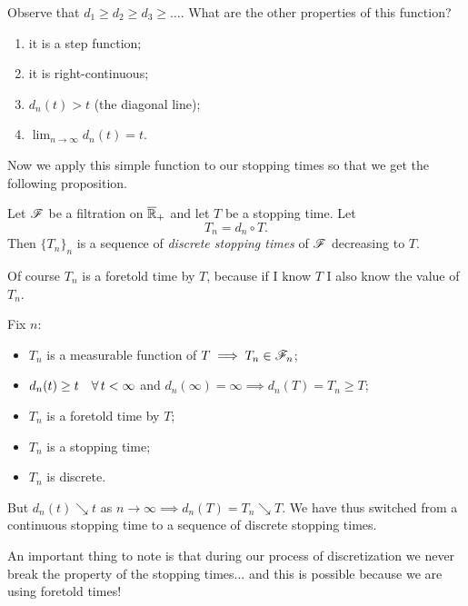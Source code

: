 \documentclass{report}
\begin{document}
Observe that $d_1\geq d_2\geq d_3\geq\ldots$. What are the other properties of this function?
\begin{enumerate}
	\item it is a step function;
	\item it is right-continuous;
	\item $d_n(t)>t$ (the diagonal line);
	\item $\lim_{n\to\infty}d_n(t)=t$.
\end{enumerate}
Now we apply this simple function to our stopping times so that we get the following proposition.
\begin{proposition}
	Let $\mathscr{F}$ be a filtration on $\overline{\mathbb{R}}_+$ and let $T$ be a stopping time. Let 
	\[T_n=d_n\circ T.\]
	Then ${\{T_n\}}_{n}$ is a sequence of \emph{discrete stopping times} of $\mathscr{F}$ decreasing to $T$.
\end{proposition}
\begin{remark}
Of course $T_n$ is a foretold time by $T$, because if I know $T$ I also know the value of $T_n$.
\end{remark}
\begin{fancyproof}
	Fix $n$:
	\begin{itemize}
		\item $T_n$ is a measurable function of $T\implies T_n\in\mathscr{F}_n$;
		\item $d_n(t)\geq t\quad\forall\, t<\infty$ and $d_n(\infty)=\infty\implies d_n(T)=T_n\geq T$;
		\item $T_n$ is a foretold time by $T$;
		\item $T_n$ is a stopping time;
		\item $T_n$ is discrete.
	\end{itemize}
	But $d_n(t)\searrow t$ as $n\to\infty\implies d_n(T)=T_n\searrow T$. We have thus switched from a continuous stopping time to a sequence of discrete stopping times.
\end{fancyproof}
An important thing to note is that during our process of discretization we never break the property of the stopping times... and this is possible because we are using foretold times!
\end{document}
